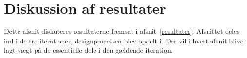 
\chapter{Diskussion af resultater} \label{diskussion}
Dette afsnit diskuteres resultaterne fremsat i afsnit~\ref{resultater}. Afsnittet deles ind i de tre iterationer, designprocessen blev opdelt i. Der vil i hvert afsnit blive lagt vægt på de essentielle dele i den gældende iteration.





